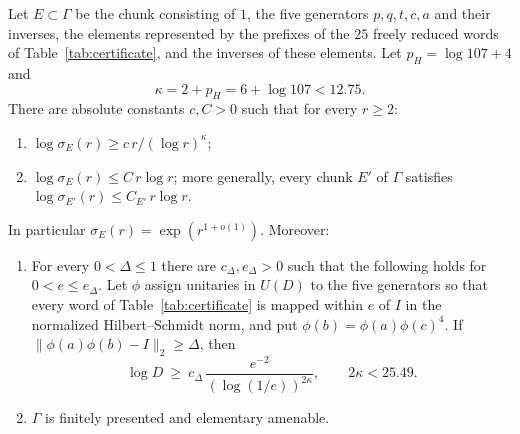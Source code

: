\begin{theorem}\label{thm:main-group}
Let $E\subset\Gamma$ be the chunk consisting of $1$, the five generators $p,q,t,c,a$ and their inverses, the elements represented by the prefixes
of the $25$ freely reduced words of Table~\ref{tab:certificate}, and the inverses of these elements. Let $p_H=\log107+4$ and
\[
\kappa=2+p_H=6+\log107<12.75 .
\]
There are absolute constants $c,C>0$ such that for every $r\ge2$:
\begin{enumerate}[label=(\alph*),itemsep=1pt]
\item $\log\sigma_E(r)\ge c\,r/(\log r)^\kappa$;
\item $\log\sigma_E(r)\le C\,r\log r$; more generally, every chunk $E'$ of $\Gamma$ satisfies $\log\sigma_{E'}(r)\le C_{E'}\,r\log r$.
\end{enumerate}
In particular $\sigma_E(r)=\exp(r^{1+o(1)})$. Moreover:
\begin{enumerate}[label=(\alph*),itemsep=1pt,resume]
\item For every $0<\Delta\le1$ there are $c_\Delta,e_\Delta>0$ such that the following holds for $0<e\le e_\Delta$. Let $\phi$ assign unitaries in
$U(D)$ to the five generators so that every word of Table~\ref{tab:certificate} is mapped within $e$ of $I$ in the normalized Hilbert--Schmidt
norm, and put $\phi(b)=\phi(a)\phi(c)^4$. If $\|\phi(a)\phi(b)-I\|_2\ge\Delta$, then
\[
\log D\ \ge\ c_\Delta\,\frac{e^{-2}}{(\log(1/e))^{2\kappa}},\qquad 2\kappa<25.49 .
\]
\item $\Gamma$ is finitely presented and elementary amenable.
\end{enumerate}
\end{theorem}


